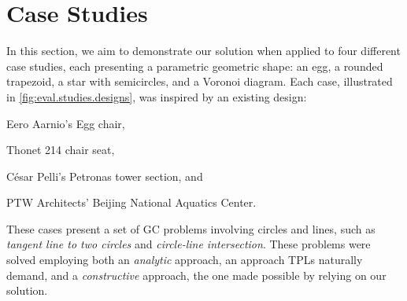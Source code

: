 \section{Case Studies}%
\label{sec:eval.studies}

In this section, we aim to demonstrate our solution when applied to four
different case studies, each presenting a parametric geometric shape: an egg, a
rounded trapezoid, a star with semicircles, and a Voronoi diagram.  Each case,
illustrated in \cref{fig:eval.studies.designs}, was inspired by an existing
design:
\begin{enumerate*}[label= (\arabic*)]
  \item Eero Aarnio's Egg chair,
  \item Thonet 214 chair seat,
  \item César Pelli's Petronas tower section, and
  \item PTW Architects' Beijing National Aquatics Center.
\end{enumerate*}
These cases present a set of \ac{GC} problems involving circles and lines, such
as \textit{tangent line to two circles} and \textit{circle-line intersection}.
These problems were solved employing both an \textit{analytic} approach, an
approach \acp{TPL} naturally demand, and a \textit{constructive} approach, the
one made possible by relying on our solution.

